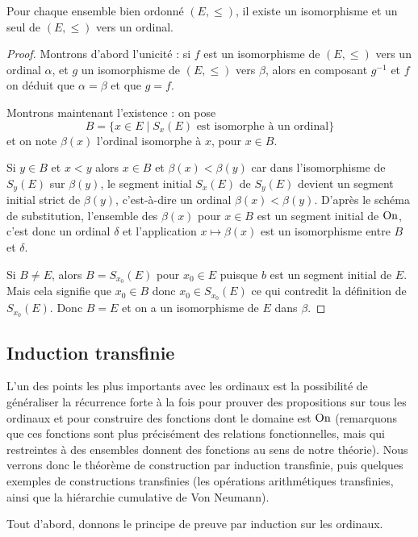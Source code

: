 \begin{them}
    Pour chaque ensemble bien ordonné $(E,\leq)$, il existe un isomorphisme et un seul de $(E,\leq)$ vers un ordinal.
\end{them}

\begin{proof}
    Montrons d'abord l'unicité : si $f$ est un isomorphisme de $(E,\leq)$ vers un ordinal $\alpha$, et $g$ un isomorphisme de $(E,\leq)$ vers $\beta$, alors en composant $g^{-1}$ et $f$ on déduit que $\alpha = \beta$ et que $g = f$.

    Montrons maintenant l'existence : on pose $$B = \{x \in E \mid S_x(E) \text{ est isomorphe à un ordinal}\}$$ et on note $\beta(x)$ l'ordinal isomorphe à $x$, pour $x\in B$.

    Si $y\in B$ et $x < y$ alors $x\in B$ et $\beta(x) < \beta(y)$ car dans l'isomorphisme de $S_y(E)$ sur $\beta(y)$, le segment initial $S_x(E)$ de $S_y(E)$ devient un segment initial strict de $\beta(y)$, c'est-à-dire un ordinal $\beta(x) < \beta(y)$. D'après le schéma de substitution, l'ensemble des $\beta(x)$ pour $x\in B$ est un segment initial de $\mathrm{On}$, c'est donc un ordinal $\delta$ et l'application $x\mapsto \beta(x)$ est un isomorphisme entre $B$ et $\delta$.

    Si $B\neq E$, alors $B = S_{x_0}(E)$ pour $x_0\in E$ puisque $b$ est un segment initial de $E$. Mais cela signifie que $x_0\in B$ donc $x_0 \in S_{x_0}(E)$ ce qui contredit la définition de $S_{x_0}(E)$. Donc $B = E$ et on a un isomorphisme de $E$ dans $\beta$.
\end{proof}

\subsection{Induction transfinie}

L'un des points les plus importants avec les ordinaux est la possibilité de généraliser la récurrence forte à la fois pour prouver des propositions sur tous les ordinaux et pour construire des fonctions dont le domaine est $\mathrm{On}$ (remarquons que ces \og fonctions\fg{} sont plus précisément des relations fonctionnelles, mais qui restreintes à des ensembles donnent des fonctions au sens de notre théorie). Nous verrons donc le théorème de construction par induction transfinie, puis quelques exemples de constructions transfinies (les opérations arithmétiques transfinies, ainsi que la hiérarchie cumulative de Von Neumann).

Tout d'abord, donnons le principe de preuve par induction sur les ordinaux.

